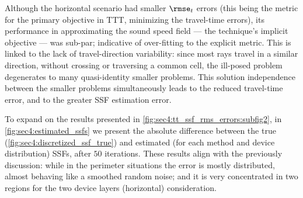 Although the horizontal scenario had smaller $\rmse_{t}$ errors (this being the metric for the primary objective in TTT, minimizing the travel-time errors), its performance in approximating the sound speed field --- the technique's implicit objective --- was sub-par; indicative of over-fitting to the explicit metric. This is linked to the lack of travel-direction variability: since most rays travel in a similar direction, without crossing or traversing a common cell, the ill-posed problem degenerates to many quasi-identity smaller problems. This solution independence between the smaller problems simultaneously leads to the reduced travel-time error, and to the greater SSF estimation error.



To expand on the results presented in \cref{fig:sec4:tt_ssf_rms_errors:subfig2}, in \cref{fig:sec4:estimated_ssfs} we present the absolute difference between the true (\cref{fig:sec4:discretized_ssf_true}) and estimated (for each method and device distribution) SSFs, after $50$ iterations. These results align with the previously discussion: while in the perimeter situations the error is mostly distributed, almost behaving like a smoothed random noise; and it is very concentrated in two regions for the two device layers (horizontal) consideration.




